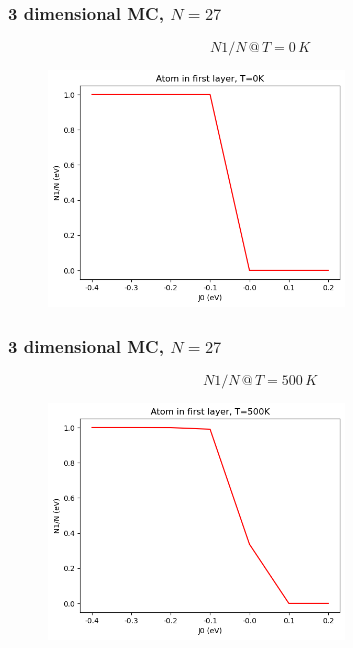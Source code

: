 \documentclass{beamer}
\begin{document}
\begin{frame}
    \frametitle{3 dimensional MC, $N=27$}

    $$N1/N\,@\,T=0\,K$$
    
    \begin{figure}
        \includegraphics[width=0.7\textwidth]{images/dratio0K.png}
    \end{figure}

\end{frame}

\begin{frame}
    \frametitle{3 dimensional MC, $N=27$}

    $$N1/N\,@\, T=500\,K$$
    
    \begin{figure}
        \includegraphics[width=0.7\textwidth]{images/dratio500K.png}
    \end{figure}

\end{frame}
\end{document}
